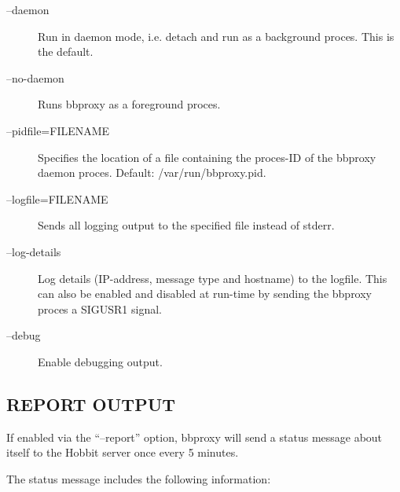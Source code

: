 \begin{description}
 

\item[--daemon] Run in daemon mode, i.e. detach and run as a background proces. This is the default. 

 

\item[--no-daemon] Runs bbproxy as a foreground proces. 

 

\item[--pidfile=FILENAME] Specifies the location of a file containing the proces-ID of the bbproxy daemon proces. Default: /var/run/bbproxy.pid. 

 

\item[--logfile=FILENAME] Sends all logging output to the specified file instead of stderr. 

 

\item[--log-details] Log details (IP-address, message type and hostname) to the logfile. This can also be enabled and disabled at run-time by sending the bbproxy proces a SIGUSR1 signal. 

 

\item[--debug] Enable debugging output. 

 


\end{description}
\subsection{REPORT OUTPUT}
 If enabled via the ``--report'' option, bbproxy will send a status message about itself to the Hobbit server once every 5 minutes. 

  The status message includes the following information: 


